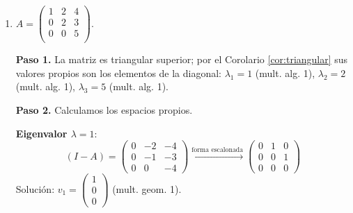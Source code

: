 \begin{example}
\begin{enumerate}[$a)$]
\begin{myproof}
\textbf{Eigenvalor $\lambda=2$}:
\[
(2I - A) = \begin{pmatrix}
1 & -2 & -2 \\
0 & 0 & -1 \\
1 & -2 & 0
\end{pmatrix} \xrightarrow{f_3 - f_1 \to f_3} \begin{pmatrix}
1 & -2 & -2 \\
0 & 0 & -1 \\
0 & 0 & 2
\end{pmatrix} \xrightarrow{f_3 + 2f_2 \to f_3} \begin{pmatrix}
1 & -2 & 0 \\
0 & 0 & 1 \\
0 & 0 & 0
\end{pmatrix}
\]
De $f_2$: $z = 0$. De $f_1$: $x = 2y$ (variable libre $y$).
Solución: $v_2 = \begin{pmatrix} 2 \\ 1 \\ 0 \end{pmatrix}$ (multiplicidad geométrica 1).

\textbf{Paso 4.} En resumen:
\[
\boxed{\lambda=1\ (\text{m.a.}=\text{m.g.}=1), \qquad \lambda=2\ (\text{m.a.}=2,\ \text{m.g.}=1).}
\]
Como la multiplicidad algebraica de $\lambda=2$ es $2$ pero la geométrica es $1$, la matriz $A$ \textbf{no es diagonalizable} (se requiere la forma canónica de Jordan para su representación canónica; véase la Subsección \ref{subsec:jordan}).
\end{myproof}
	
	\item $A=\left( \begin{array}{ccc} 
	1&2&4 \\
	0&2&3\\
	0&0&5\\
	\end{array} \right).$ 
\begin{myproof}
\textbf{Paso 1.} La matriz es triangular superior; por el Corolario \ref{cor:triangular} sus valores propios son los elementos de la diagonal:
$\lambda_1 = 1$ (mult. alg. 1), $\lambda_2 = 2$ (mult. alg. 1), $\lambda_3 = 5$ (mult. alg. 1).

\textbf{Paso 2.} Calculamos los espacios propios.

\textbf{Eigenvalor $\lambda=1$}:
\[
(I - A) = \begin{pmatrix}
0 & -2 & -4 \\
0 & -1 & -3 \\
0 & 0 & -4
\end{pmatrix} \xrightarrow{\text{forma escalonada}} \begin{pmatrix}
0 & 1 & 0 \\
0 & 0 & 1 \\
0 & 0 & 0
\end{pmatrix}
\]
Solución: $v_1 = \begin{pmatrix} 1 \\ 0 \\ 0 \end{pmatrix}$ (mult. geom. 1).


\end{myproof}
\end{enumerate}
\end{example}
